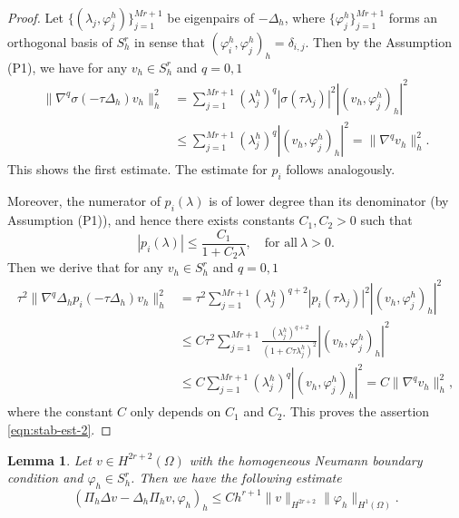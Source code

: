 \documentclass[a4paper, oneside]{book}
\def\II{(\Omega)}
\def\fy{\varphi}
\newtheorem{lemma}{Lemma}[section]
\begin{document}
\begin{proof}
Let $\{(\lambda_j, \fy_j^h)\}_{j=1}^{Mr+1}$ be eigenpairs of $-\Delta_h$, where $\{\fy_j^h\}_{j=1}^{Mr+1}$
forms an orthogonal basis of $S_h^r$
in sense that $ (\fy_i^h,\fy_j^h)_h = \delta_{i,j} $.
Then by the Assumption (P1),
we have for any $v_h \in S_h^r$ and $q=0,1$
\begin{align*}
 \| \nabla^q \sigma(-\tau \Delta_h) v_h \|_h^2 &=  \sum_{j=1}^{Mr+1}(\lambda_j^h)^q|\sigma(\tau\lambda_j)|^2 |(v_h , \fy_j^h)_h|^2\\
& \le \sum_{j=1}^{Mr+1} (\lambda_j^h)^q  |(v_h , \fy_j^h)_h|^2 = \| \nabla^q  v_h \|_h^2.
 \end{align*}
This shows the first estimate. The estimate for $p_i$ follows analogously.

Moreover, the numerator of $p_i(\lambda)$
is of lower degree than its denominator (by Assumption (P1)),
and hence there exists  constants $C_1, C_2>0$ such that
$$  |p_i(\lambda)| \le \frac{C_1}{1+C_2\lambda},\quad \text{for all} ~\lambda>0. $$
Then we derive that  for any $v_h \in S_h^r$ and $q=0,1$
\begin{align*}
\tau^2 \|  \nabla^q \Delta_h p_i (-\tau \Delta_h) v_h \|_h^2
&= \tau^2\sum_{j=1}^{Mr+1}(\lambda_j^h)^{q+2} |p_i(\tau\lambda_j)|^2 |(v_h , \fy_j^h)_h|^2\\
& \le C\tau^2\sum_{j=1}^{Mr+1} \frac{(\lambda_j^h)^{q+2}}{(1+C\tau\lambda_j^h)^2}  |(v_h , \fy_j^h)_h|^2 \\
& \le C \sum_{j=1}^{Mr+1} (\lambda_j^h)^q  |(v_h , \fy_j^h)_h|^2 = C\| \nabla^q  v_h \|_h^2,
\end{align*}
where the constant $C$ only depends on $C_1$ and $C_2$.
This proves the assertion \eqref{eqn:stab-est-2}.
\end{proof}


\begin{lemma}\label{lem:truncation}
Let $v\in H^{2r+2}(\Omega)$ with the homogeneous Neumann boundary condition
and $\fy_h\in S_h^r$. Then we have the following estimate
$$ (\Pi_h \Delta v - \Delta_h \Pi_h v, \fy_h )_h \le Ch^{r+1} \| v \|_{H^{2r+2}} \|\fy_h \|_{H^1\II}. $$%
\end{lemma}
\end{document}
